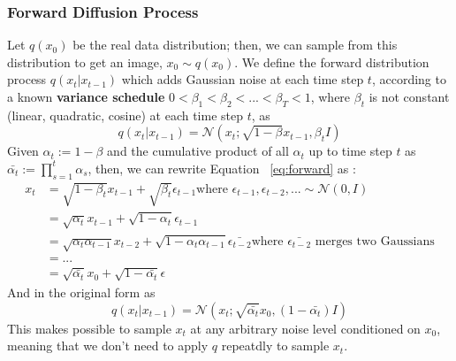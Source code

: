 \documentclass[preprint]{elsarticle}
\begin{document}
\subsubsection{Forward Diffusion Process}
Let $q(x_0)$ be the real data distribution; then, we can sample from this distribution to get an image, $x_0 \sim q(x_0)$. 
We define the forward distribution process $q(x_t|x_{t-1})$ which adds Gaussian noise at each time step $t$, 
according to a known \textbf{variance schedule} $0<\beta_1<\beta_2<...<\beta_T<1$, where $\beta_t$ 
is not constant (linear, quadratic, cosine) at each time step $t$, 
as
\begin{equation} \label{eq:forward}
	q(x_t|x_{t-1}) = \mathcal{N}(x_t; \sqrt{1-\beta}x_{t-1}, \beta_t I)
\end{equation}
Given $\alpha_t:=1-\beta$ and the cumulative product of all $\alpha_t$ up to time step $t$ as 
$\bar{\alpha_t} := \prod_{s=1}^t\alpha_s$, then, we can rewrite Equation ~\ref{eq:forward} as 
\cite{weng2021diffusion}:
\begin{equation}
	\begin{split}
		x_t & = \sqrt{1-\beta_t}x_{t-1} + \sqrt{\beta_t}\epsilon_{t-1}
		\text{where $\epsilon_{t-1},\epsilon_{t-2},... \sim \mathcal{N}(0,I)$}\\
		& = \sqrt{\alpha_t}x_{t-1} + \sqrt{1-\alpha_t}\epsilon_{t-1} \\
		& = \sqrt{\alpha_t\alpha_{t-1}}x_{t-2} + \sqrt{1-\alpha_t\alpha_{t-1}}\bar{\epsilon_{t-2}} 
		\text{where $\bar{\epsilon_{t-2}}$ merges two Gaussians}\\
		& = ... \\
		& = \sqrt{\bar{\alpha_t}}x_0 + \sqrt{1-\bar{\alpha_t}}\epsilon 
	\end{split}
\end{equation}
And in the original form as
\begin{equation} \label{eq:forward2}
	q(x_t|x_{t-1}) = \mathcal{N}(x_t; \sqrt{\bar{\alpha_t}}x_0, (1 -\bar{\alpha_t}) I)
\end{equation}
This makes possible to sample $x_t$ at any arbitrary noise level conditioned on $x_0$,
meaning that we don't need to apply $q$ repeatdly to sample $x_t$.
\end{document}
